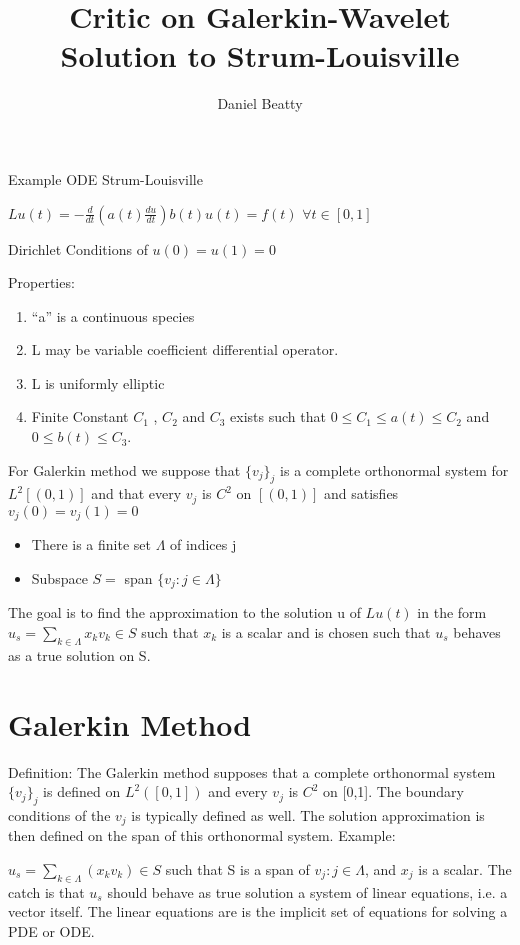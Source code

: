\documentclass[11pt]{article}
\title{Critic on Galerkin-Wavelet Solution to Strum-Louisville}
\author{Daniel Beatty}
\begin{document}
\maketitle

Example ODE Strum-Louisville 

$Lu(t) = -\frac{d}{dt} (a(t) \frac{du}{dt} ) b(t) u(t) = f(t) $  $\forall t \in [0,1]$

Dirichlet Conditions of $u(0)=u(1) = 0$

Properties:
\begin{enumerate}
\item ``a'' is a continuous species
\item L may be variable coefficient differential operator.
\item L is uniformly elliptic 
\item Finite Constant $C_1$ , $C_2$ and $C_3$ exists such that $0\le C_1 \le a(t) \le C_2$ and $0 \le b(t) \le C_3$.
\end{enumerate}

For Galerkin method we suppose that $\{v_j\}_j$ is a complete orthonormal system for $L^2[(0,1)]$ and that every $v_j$ is $C^2$ on $[(0,1)]$ and satisfies $v_j(0)= v_j (1) = 0$
\begin{itemize}
\item There is a finite set $\Lambda$ of indices j
\item Subspace $S=$ span $\{v_j: j\in \Lambda \} $
\end{itemize}

The goal is to find the approximation to the solution u of $Lu(t)$ in the form $u_s = \sum _{k\in \Lambda} x_k v_k \in S$ such that $x_k$ is a scalar and is chosen such that $u_s$ behaves as a true solution on S.  

\section {Galerkin Method}
Definition:  The Galerkin method supposes that a complete orthonormal system $\{v_j\}_j$ is defined on $L^2([0,1])$ and every $v_j$ is $C^2$ on [0,1].  The boundary conditions of the $v_j$ is typically defined as well.  The solution approximation is then defined on the span of this orthonormal system.  Example:

$u_s = \sum_{k\in \Lambda} (x_k v_k )\in S$ such that S is a span of $v_j : j\in \Lambda$, and $x_j$ is a scalar.  The catch is that $u_s$ should behave as true solution a system of linear equations, i.e. a vector itself.  The linear equations are is the implicit set of equations for solving a PDE or ODE.  
\end{document}
